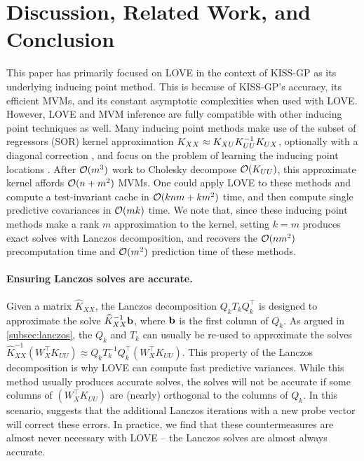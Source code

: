 \section{Discussion, Related Work, and Conclusion}
\label{sec:discussion}

This paper has primarily focused on LOVE{} in the context of KISS-GP as its underlying inducing point method.
This is because of KISS-GP's accuracy, its efficient MVMs, and its constant asymptotic complexities when used with LOVE{}.
However, LOVE and MVM inference are fully compatible with other inducing point techniques as well. Many inducing point methods make use of the subset of regressors (SOR) kernel approximation $K_{XX} \approx
K_{XU}K_{UU}^{-1}K_{UX}$, optionally with a diagonal correction \cite{snelson2006sparse}, and focus on the problem of learning the
inducing point locations \cite{quinonero2005unifying,titsias2009variational}. After $\bigo{m^{3}}$ work to Cholesky decompose
$\bigo{\bK_{UU}}$, this approximate kernel affords $\bigo{n + m^{2}}$ MVMs. One could apply LOVE to these methods and
compute a test-invariant cache in $\bigo{knm+km^{2}}$ time, and then compute single predictive covariances in $\bigo{mk}$ time.
We note that, since these inducing point methods make a rank $m$ approximation to the kernel, setting $k\!=\!m$ produces exact solves with Lanczos decomposition, and recovers the $\bigo{nm^{2}}$ precomputation time and $\bigo{m^2}$ prediction time of these methods.

\paragraph{Ensuring Lanczos solves are accurate.}
Given a matrix $\widehat K_{XX}$, the Lanczos decomposition $Q_k T_k Q_k^\top$ is designed to approximate the solve $\widehat K_{XX}^{-1} \mathbf{b}$, where $\mathbf{b}$ is the first column of $Q_k$.
As argued in \autoref{subsec:lanczos}, the $Q_k$ and $T_k$ can usually be re-used to approximate the solves $\widehat K_{XX}^{-1} (W_X^\top K_{UU}) \approx Q_k T_k^{-1} Q_k^\top (W_X^\top K_{UU})$.
This property of the Lanczos decomposition is why LOVE{} can compute fast predictive variances.
While this method usually produces accurate solves, the solves will not be accurate if some columns of $(W^\top_X K_{UU})$ are (nearly) orthogonal to the columns of $Q_k$.
In this scenario, \citet{saad1987lanczos} suggests that the additional Lanczos iterations with a new probe vector will correct these errors.
In practice, we find that these countermeasures are almost never necessary with LOVE{} -- the Lanczos solves are almost always accurate.

